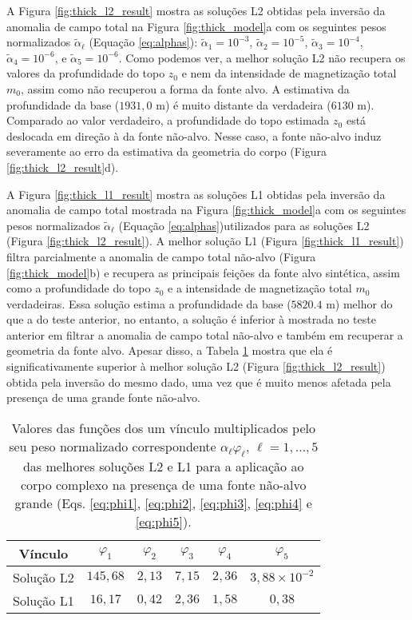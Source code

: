 A Figura \ref{fig:thick_l2_result} mostra as soluções L2 obtidas pela inversão da anomalia de campo total na Figura \ref{fig:thick_model}a
com os seguintes pesos normalizados $\tilde{\alpha}_{\ell}$ (Equação \ref{eq:alphas}):
$\tilde{\alpha}_{1} = 10^{-3}$, $\tilde{\alpha}_{2} = 10^{-5}$, 
$\tilde{\alpha}_{3} = 10^{-4}$, $\tilde{\alpha}_{4} = 10^{-6}$, e 
$\tilde{\alpha}_{5} = 10^{-6}$.
Como podemos ver, a melhor solução L2 não recupera os valores da profundidade do topo $z_{0}$ e nem da intensidade de magnetização total $m_{0}$, assim como não recuperou a forma da fonte alvo.
A estimativa da profundidade da base ($1931,0$ m) é muito distante da verdadeira ($6130$ m).
Comparado ao valor verdadeiro, a profundidade do topo estimada $z_{0}$ está deslocada em direção à da fonte não-alvo.
Nesse caso, a fonte não-alvo induz severamente ao erro da estimativa da geometria do corpo (Figura \ref{fig:thick_l2_result}d).

A Figura \ref{fig:thick_l1_result} mostra as soluções L1 obtidas pela inversão da anomalia de campo total mostrada na Figura \ref{fig:thick_model}a
com os seguintes pesos normalizados $\tilde{\alpha}_{\ell}$ (Equação \ref{eq:alphas})utilizados para as soluções L2 (Figura \ref{fig:thick_l2_result}).
A melhor solução L1 (Figura \ref{fig:thick_l1_result}) filtra parcialmente a anomalia de campo total não-alvo (Figura \ref{fig:thick_model}b) e recupera as principais feições da fonte alvo sintética, assim como a profundidade do topo $z_{0}$ e a intensidade de magnetização total $m_{0}$ verdadeiras.
Essa solução estima a profundidade da base ($5820.4$ m) melhor do que a do teste anterior, no entanto, a solução é inferior à mostrada no teste anterior em filtrar a anomalia de campo total não-alvo e também em recuperar a geometria da fonte alvo.
Apesar disso, a Tabela \ref{tab:thick} mostra que ela é significativamente superior à melhor solução L2 (Figura \ref{fig:thick_l2_result}) obtida pela inversão do mesmo dado, uma vez que é muito menos afetada pela presença de uma grande fonte não-alvo.

\begin{table}[h]\label{tab:thick}
	\caption{Valores das funções dos um vínculo multiplicados pelo seu peso normalizado correspondente $ \alpha_\ell \varphi_\ell  $, $ \ell=1,\dots,5 $ das melhores soluções L2 e L1 para a aplicação ao corpo complexo na presença de uma fonte não-alvo grande (Eqs. \ref{eq:phi1}, \ref{eq:phi2}, \ref{eq:phi3}, \ref{eq:phi4} e \ref{eq:phi5}).}
	\centering
	\vspace{0.5cm}
	\begin{tabular}{c|ccccc}
		Vínculo & $ \varphi _1 $ & $ \varphi _2 $ &  $ \varphi _3 $ &  $ \varphi _4 $ &  $ \varphi _5 $ \\
		\hline
		Solução L2 & $ 145,68 $ & $ 2,13 $ & $ 7,15 $ & $ 2,36 $ & $3,88 \times 10^{-2} $ \\ 
		Solução L1 & $ 16,17 $ & $ 0,42 $ & $ 2,36 $ & $ 1,58 $ & $ 0,38 $
	\end{tabular}
\end{table}

